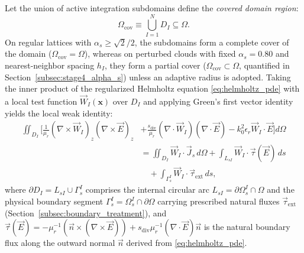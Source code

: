 \documentclass[VANCOUVER,Times1COL]{WileyNJD-v5}
\begin{document}
Let the union of active integration subdomains define the \emph{covered domain region}:
\begin{equation}
    \Omega_{\mathrm{cov}} \equiv \bigcup_{I=1}^N D_I \subseteq \Omega.
    \label{eq:covered_region_def}
\end{equation}
On regular lattices with $\alpha_s \ge \sqrt{2}/2$, the subdomains form a complete cover of the domain ($\Omega_{\mathrm{cov}} = \Omega$), whereas on perturbed clouds with fixed $\alpha_s = 0.80$ and nearest-neighbor spacing $h_I$, they form a partial cover ($\Omega_{\mathrm{cov}} \subset \Omega$, quantified in Section~\ref{subsec:stage4_alpha_s}) unless an adaptive radius is adopted. Taking the inner product of the regularized Helmholtz equation \eqref{eq:helmholtz_pde} with a local test function $\vec{W}_I(\mathbf{x})$ over $D_I$ and applying Green's first vector identity yields the local weak identity:
\begin{equation}
    \begin{aligned}
        \iint_{D_I} \bigg[ \frac{1}{\mu_r} (\nabla \times \vec{W}_I)_z (\nabla \times \vec{E})_z & + \frac{s_{\mathrm{div}}}{\mu_r} (\nabla \cdot \vec{W}_I) (\nabla \cdot \vec{E}) - k_0^2 \epsilon_r \vec{W}_I \cdot \vec{E} \bigg] d\Omega \\
                                                                                                    & = \iint_{D_I} \vec{W}_I \cdot \vec{J}_s \, d\Omega + \int_{L_{sI}} \vec{W}_I \cdot \vec{\tau}(\vec{E}) \, ds \\
                                                                                                    & \quad + \int_{\Gamma_s^I} \vec{W}_I \cdot \vec{\tau}_{\mathrm{ext}} \, ds,
    \end{aligned}
    \label{eq:local_weak_form}
\end{equation}
where $\partial D_I = L_{sI} \cup \Gamma_s^I$ comprises the internal circular arc $L_{sI} = \partial\Omega_s^I \cap \Omega$ and the physical boundary segment $\Gamma_s^I = \Omega_s^I \cap \partial\Omega$ carrying prescribed natural fluxes $\vec{\tau}_{\mathrm{ext}}$ (Section~\ref{subsec:boundary_treatment}), and $\vec{\tau}(\vec{E}) = -\mu_r^{-1}(\vec{n} \times (\nabla \times \vec{E})) + s_{\mathrm{div}}\mu_r^{-1}(\nabla \cdot \vec{E})\vec{n}$ is the natural boundary flux along the outward normal $\vec{n}$ derived from \eqref{eq:helmholtz_pde}.
\end{document}
